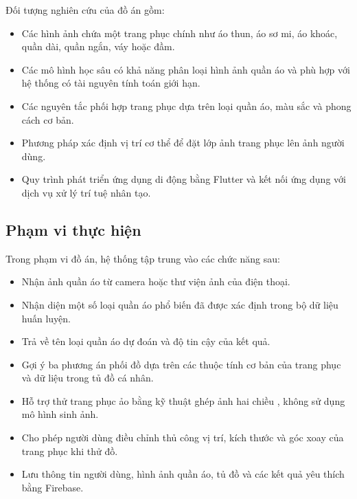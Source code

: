 Đối tượng nghiên cứu của đồ án gồm:

\begin{itemize}[leftmargin=1.6em, itemsep=3pt]
  \item Các hình ảnh chứa một trang phục chính như áo thun, áo sơ mi, áo
        khoác, quần dài, quần ngắn, váy hoặc đầm.

  \item Các mô hình học sâu có khả năng phân loại hình ảnh quần áo và phù
        hợp với hệ thống có tài nguyên tính toán giới hạn.

  \item Các nguyên tắc phối hợp trang phục dựa trên loại quần áo, màu sắc
        và phong cách cơ bản.

  \item Phương pháp xác định vị trí cơ thể để đặt lớp ảnh trang phục lên ảnh
        người dùng.

  \item Quy trình phát triển ứng dụng di động bằng Flutter và kết nối ứng
        dụng với dịch vụ xử lý trí tuệ nhân tạo.
\end{itemize}

\subsection{Phạm vi thực hiện}

Trong phạm vi đồ án, hệ thống tập trung vào các chức năng sau:

\begin{itemize}[leftmargin=1.6em, itemsep=3pt]
  \item Nhận ảnh quần áo từ camera hoặc thư viện ảnh của điện thoại.

  \item Nhận diện một số loại quần áo phổ biến đã được xác định trong bộ dữ
        liệu huấn luyện.

  \item Trả về tên loại quần áo dự đoán và độ tin cậy của kết quả.

  \item Gợi ý ba phương án phối đồ dựa trên các thuộc tính cơ bản của trang
        phục và dữ liệu trong tủ đồ cá nhân.

  \item Hỗ trợ thử trang phục ảo bằng kỹ thuật ghép ảnh hai chiều
        , không sử dụng mô hình sinh ảnh.

  \item Cho phép người dùng điều chỉnh thủ công vị trí, kích thước và góc
        xoay của trang phục khi thử đồ.

  \item Lưu thông tin người dùng, hình ảnh quần áo, tủ đồ và các kết quả yêu
        thích bằng Firebase.
\end{itemize}

